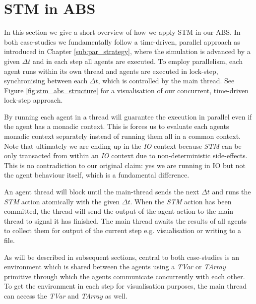 \section{STM in ABS}
\label{sec:stm_abs}
In this section we give a short overview of how we apply STM in our ABS. In both case-studies we fundamentally follow a time-driven, parallel approach as introduced in Chapter \ref{sub:par_strategy}, where the simulation is advanced by a given $\Delta t$ and in each step all agents are executed. To employ parallelism, each agent runs within its own thread and agents are executed in lock-step, synchronising between each $\Delta t$, which is controlled by the main thread. See Figure \ref{fig:stm_abs_structure} for a visualisation of our concurrent, time-driven lock-step approach.

By running each agent in a thread will guarantee the execution in parallel even if the agent has a monadic context. This is forces us to evaluate each agents monadic context separately instead of running them all in a common context. Note that ultimately we are ending up in the \textit{IO} context because \textit{STM} can be only transacted from within an \textit{IO} context due to non-deterministic side-effects. This is no contradiction to our original claim: yes we are running in IO but not the agent behaviour itself, which is a fundamental difference.

An agent thread will block until the main-thread sends the next $\Delta t$ and runs the \textit{STM} action atomically with the given $\Delta t$. When the \textit{STM} action has been committed, the thread will send the output of the agent action to the main-thread to signal it has finished. The main thread awaits the results of all agents to collect them for output of the current step e.g. visualisation or writing to a file.

As will be described in subsequent sections, central to both case-studies is an environment which is shared between the agents using a \textit{TVar} or \textit{TArray} primitive through which the agents communicate concurrently with each other. To get the environment in each step for visualisation purposes, the main thread can access the \textit{TVar} and \textit{TArray} as well. 

